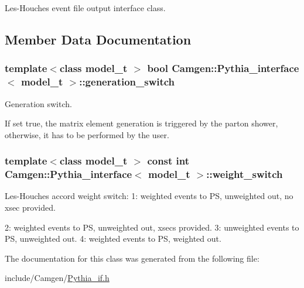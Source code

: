 Les-\/\-Houches event file output interface class. 

\subsection{Member Data Documentation}
\hypertarget{a00448_a5ecb4d493254caf2ae844b3b6a982671}{
\subsubsection[{generation\-\_\-switch}]{\setlength{\rightskip}{0pt plus 5cm}template$<$class model\-\_\-t $>$ bool {\bf Camgen\-::\-Pythia\-\_\-interface}$<$ model\-\_\-t $>$\-::generation\-\_\-switch}}\label{a00448_a5ecb4d493254caf2ae844b3b6a982671}


Generation switch. 

If set true, the matrix element generation is triggered by the parton shower, otherwise, it has to be performed by the user. \hypertarget{a00448_a75fd3fbc4856898df3bcf66530af81e0}{
\subsubsection[{weight\-\_\-switch}]{\setlength{\rightskip}{0pt plus 5cm}template$<$class model\-\_\-t $>$ const int {\bf Camgen\-::\-Pythia\-\_\-interface}$<$ model\-\_\-t $>$\-::weight\-\_\-switch}}\label{a00448_a75fd3fbc4856898df3bcf66530af81e0}


Les-\/\-Houches accord weight switch\-: 1\-: weighted events to P\-S, unweighted out, no xsec provided. 

2\-: weighted events to P\-S, unweighted out, xsecs provided. 3\-: unweighted events to P\-S, unweighted out. 4\-: weighted events to P\-S, weighted out. 

The documentation for this class was generated from the following file\-:\begin{DoxyCompactItemize}
\item 
include/\-Camgen/\hyperlink{a00721}{Pythia\-\_\-if.\-h}\end{DoxyCompactItemize}
